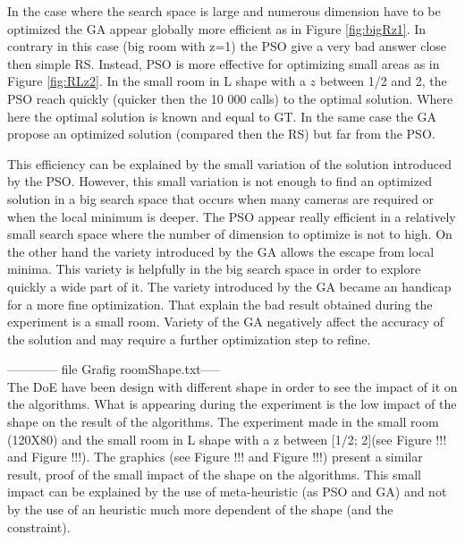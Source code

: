 In the case where the search space is large and numerous dimension have to be optimized the GA appear globally more efficient as in Figure \ref{fig:bigRz1}. In contrary in this case (big room with z=1) the PSO give a very bad answer close then simple RS.
 Instead, PSO is more effective for optimizing small areas as in Figure \ref{fig:RLz2}. In the small room in L shape with a $z$ between 1/2 and 2, the PSO reach quickly (quicker then the 10 000 calls) to the optimal solution. Where here the optimal solution is known and equal to GT. In the same case the GA propose an optimized solution (compared then the RS) but far from the PSO.
 
 This efficiency can be explained by the small variation of the solution introduced by the PSO. However, this small variation is not enough to find an optimized solution in a big search space that occurs when many cameras are required or when the local minimum is deeper. The PSO appear really efficient in a relatively small search space where the number of dimension to optimize is not to high.
 On the other hand the variety  introduced by the GA allows the escape from local minima. This variety is helpfully  in the big search space in order to explore quickly a wide part of it. The variety introduced by the GA became an handicap for a more fine optimization. That explain the bad result obtained during the experiment is a small room. Variety of the GA negatively affect the accuracy of the solution and may require a further optimization step to refine. 
 
------------ file Grafig roomShape.txt-----\\
The DoE have been design with different shape in order to see the impact of it on the algorithms. What is appearing during the experiment is the low impact of the shape on the result of the algorithms. The experiment made in the small room (120X80) and the small room in L shape with a z between [1/2; 2](see Figure !!! and Figure !!!). The graphics (see Figure !!! and Figure !!!)  present a similar result, proof of the small impact of the shape on the algorithms.
 This small impact can be explained by the use of meta-heuristic (as PSO and GA) and not by the use of an heuristic  much more dependent of the shape (and the constraint). 
 
